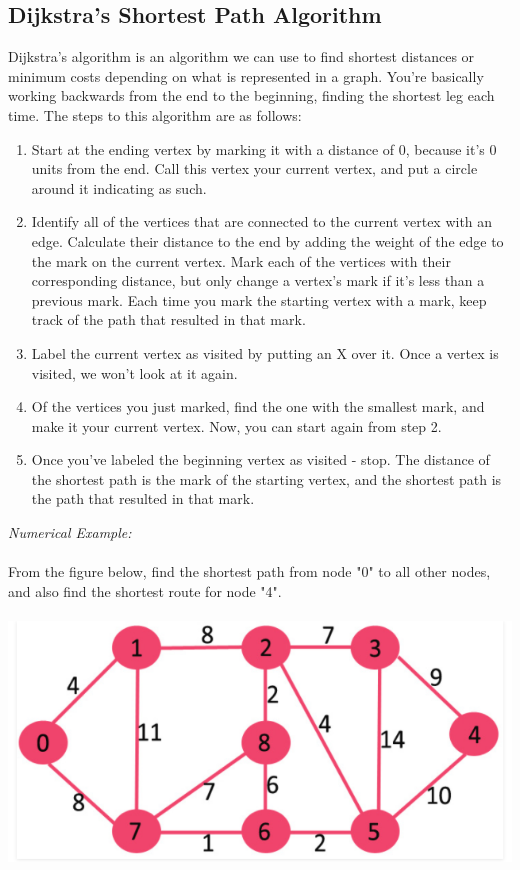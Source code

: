\subsection{Dijkstra's Shortest Path Algorithm}
Dijkstra's algorithm is an algorithm we can use to find shortest distances or minimum costs depending on what is represented in a graph. You're basically working backwards from the end to the beginning, finding the shortest leg each time. The steps to this algorithm are as follows:
\begin{enumerate}
	\item Start at the ending vertex by marking it with a distance of 0, because it's 0 units from the end. Call this vertex your current vertex, and put a circle around it indicating as such.
	\item Identify all of the vertices that are connected to the current vertex with an edge. Calculate their distance to the end by adding the weight of the edge to the mark on the current vertex. Mark each of the vertices with their corresponding distance, but only change a vertex's mark if it's less than a previous mark. Each time you mark the starting vertex with a mark, keep track of the path that resulted in that mark.
	\item Label the current vertex as visited by putting an X over it. Once a vertex is visited, we won't look at it again.
	\item Of the vertices you just marked, find the one with the smallest mark, and make it your current vertex. Now, you can start again from step 2.
	\item Once you've labeled the beginning vertex as visited - stop. The distance of the shortest path is the mark of the starting vertex, and the shortest path is the path that resulted in that mark.
\end{enumerate}
%
\textit{Numerical Example:}\\\\
From the figure below, find the shortest path from node "0" to all other nodes, and also find the shortest route for node "4".\\\\
\includegraphics[scale=0.7]{gfx/fig31.png}\\\\

